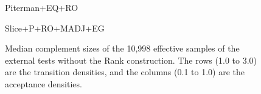 \makeatletter
\setlength{\@fptop}{0pt}
\makeatother

\begin{figure}[h]
  \centering
  \begin{scriptsize}
  \renewcommand{\tabcolsep}{0.05cm}
  \begin{subtable}[t]{\subwidth\textwidth}
    \centering
    
    \caption{Piterman+EQ+RO}
  \end{subtable}
  \hfill
  \begin{subtable}[t]{\subwidth\textwidth}
    \centering
    
    \caption{Slice+P+RO+MADJ+EG}
  \end{subtable}
\end{scriptsize}
\caption{Median complement sizes of the 10,998 effective samples of the external tests without the Rank construction. The rows (1.0 to 3.0) are the transition densities, and the columns (0.1 to 1.0) are the acceptance densities.}
\end{figure}



\renewcommand{\arraystretch}{1.15}

